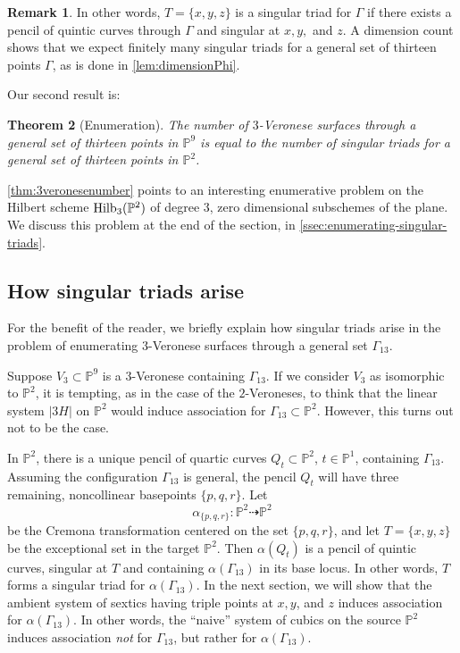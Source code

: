 \documentclass[reqno, 11pt]{amsart}
\theoremstyle{definition}
\theoremstyle{remark}
\numberwithin{equation}{section}
\numberwithin{thm}{section}
\numberwithin{prop}{section}
\numberwithin{lem}{section}
\numberwithin{cor}{section}
\numberwithin{conj}{section}
\numberwithin{defn}{section}
\newcommand {\from}{{\colon}}
\theoremstyle{plain}
\newtheorem{theorem}{Theorem}[section]
\theoremstyle{definition}
\newtheorem{remark}[theorem]{Remark}
\newcommand\bp{{\mathbb P}}
\begin{document}
\begin{remark}
	In other words, $T = \{x,y,z\}$ is a singular triad for $\Gamma$ if there exists a pencil of quintic curves through $\Gamma$ and singular at $x, y,$ and $z$. A dimension count shows that we expect finitely many singular triads for a general set of thirteen points $\Gamma$, as is done in \autoref{lem:dimensionPhi}.
\end{remark}

Our second result is:

\begin{theorem}[Enumeration]\label{thm:3veronesenumber}
The number of $3$-Veronese surfaces through a general set of thirteen points in $\bp^{9}$ is equal to the number of singular triads for a general set of thirteen points in $\bp^{2}$.
\end{theorem}

\autoref{thm:3veronesenumber} points to an interesting enumerative problem on the Hilbert scheme ${\rm Hilb}_{3}(\bp^{2})$ of degree $3$, zero dimensional subschemes of the plane.  We discuss this problem at the end of the section, in 
\autoref{ssec:enumerating-singular-triads}.

\subsection{How singular triads arise}\label{section:howsingtriadsArise} For the benefit of the reader, we briefly explain how singular triads arise in the problem of enumerating $3$-Veronese surfaces through a general set $\Gamma_{13}$.  

Suppose $V_{3} \subset \bp^{9}$ is a $3$-Veronese containing $\Gamma_{13}$.   If we consider $V_{3}$ as isomorphic to $\bp^{2}$, it is tempting, as in the case of the $2$-Veroneses, to think that the linear system $|3H|$ on $\bp^{2}$ would induce association for $\Gamma_{13} \subset \bp^{2}$.  However, this turns out not to be the case. 

In $\bp^{2}$, there is a unique pencil of quartic curves $Q_{t} \subset \bp^{2}$, $t \in \bp^{1}$, containing $\Gamma_{13}$.  Assuming the configuration $\Gamma_{13}$ is general, the pencil $Q_{t}$ will have three remaining, noncollinear basepoints $\{p,q,r\}$.  Let \[\alpha_{\{p,q,r\}} \from \bp^{2} \dashrightarrow \bp^{2}\] be the Cremona transformation centered on the set $\{p,q,r\}$, and let $T = \{x,y,z\}$ be the exceptional set 
in the target $\bp^{2}$. Then $\alpha(Q_{t})$ is a pencil of quintic curves, singular at $T$ and containing $\alpha(\Gamma_{13})$ in its base locus.  In other words, $T$ forms a singular triad for $\alpha(\Gamma_{13})$. In the next section, we will show that the ambient system of sextics having triple points at $x,y$, and $z$ induces association for $\alpha(\Gamma_{13})$.  In other words, the ``naive'' system of cubics on the source $\bp^{2}$ induces association {\sl not} for $\Gamma_{13}$, but rather for $\alpha(\Gamma_{13})$.  
\end{document}
